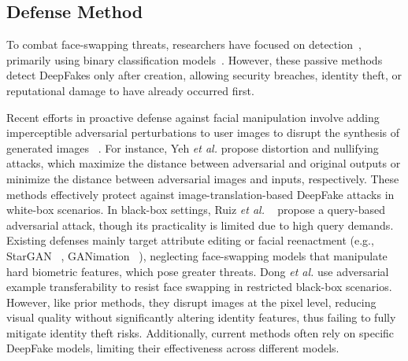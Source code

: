 \subsection{Defense Method}
To combat face-swapping threats, researchers have focused on detection~\cite{gu2022delving, wang2024deepfake}, primarily using binary classification models~\cite{masood2023trend1}.  
However, these passive methods detect DeepFakes only after creation, allowing security breaches, identity theft, or reputational damage to have already occurred first.

Recent efforts in proactive defense against facial manipulation involve adding imperceptible adversarial perturbations to user images to disrupt the synthesis of generated images ~\cite{ruiz2020disrupting, huang2021initiative}. For instance, Yeh \textit{et al.} \cite{yeh2020disrupting} propose distortion and nullifying attacks, which maximize the distance between adversarial and original outputs or minimize the distance between adversarial images and inputs, respectively. These methods effectively protect against image-translation-based DeepFake attacks in white-box scenarios. In black-box settings, Ruiz \textit{et al.} ~\cite{ruiz2020protecting} propose a query-based adversarial attack, though its practicality is limited due to high query demands.
Existing defenses mainly target attribute editing or facial reenactment (e.g., StarGAN ~\cite{choi2018stargan}, GANimation ~\cite{pumarola2018ganimation}), neglecting face-swapping models that manipulate hard biometric features, which pose greater threats. Dong \textit{et al.} \cite{dong2023restricted} use adversarial example transferability to resist face swapping in restricted black-box scenarios. However, like prior methods, they disrupt images at the pixel level, reducing visual quality without significantly altering identity features, thus failing to fully mitigate identity theft risks. Additionally, current methods often rely on specific DeepFake models, limiting their effectiveness across different models.

